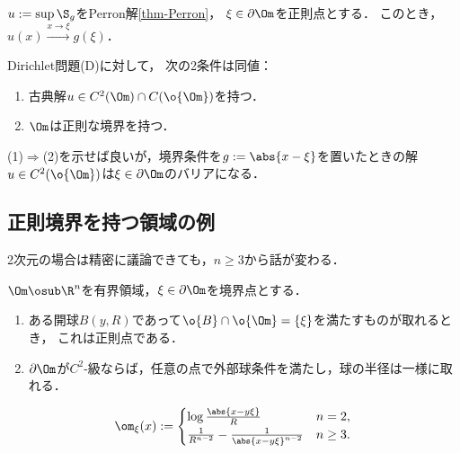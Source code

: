 \documentclass[uplatex,dvipdfmx]{jsreport}
\begin{document}
\begin{proposition}[正則点における境界条件の達成]
    $u:=\sup\S_g$をPerron解\ref{thm-Perron}，
    $\xi\in\partial\Om$を正則点とする．
    このとき，$u(x)\xrightarrow{x\to\xi}g(\xi)$．
\end{proposition}

\begin{corollary}
    Dirichlet問題(D)に対して，
    次の2条件は同値：
    \begin{enumerate}
        \item 古典解$u\in C^2(\Om)\cap C(\o{\Om})$を持つ．
        \item $\Om$は正則な境界を持つ．
    \end{enumerate}
\end{corollary}
\begin{Proof}
    (1)$\Rightarrow$(2)を示せば良いが，境界条件を$g:=\abs{x-\xi}$を置いたときの解$u\in C^2(\o{\Om})$は$\xi\in\partial\Om$のバリアになる．
\end{Proof}

\subsection{正則境界を持つ領域の例}

\begin{tcolorbox}[colframe=ForestGreen, colback=ForestGreen!10!white,breakable,colbacktitle=ForestGreen!40!white,coltitle=black,fonttitle=\bfseries\sffamily,
title=]
    2次元の場合は精密に議論できても，$n\ge3$から話が変わる．
\end{tcolorbox}

\begin{proposition}[外部球条件]
    $\Om\osub\R^n$を有界領域，$\xi\in\partial\Om$を境界点とする．
    \begin{enumerate}
        \item ある開球$B(y,R)$であって$\o{B}\cap\o{\Om}=\{\xi\}$を満たすものが取れるとき，
        これは正則点である．
        \item $\partial\Om$が$C^2$-級ならば，任意の点で外部球条件を満たし，球の半径は一様に取れる．
    \end{enumerate}
\end{proposition}
\begin{Proof}
    \[\om_\xi(x):=\begin{cases}
        \log\frac{\abs{x-y\xi}}{R}&n=2,\\
        \frac{1}{R^{n-2}}-\frac{1}{\abs{x-y\xi}^{n-2}}&n\ge3.
    \end{cases}\]
\end{Proof}
\end{document}
